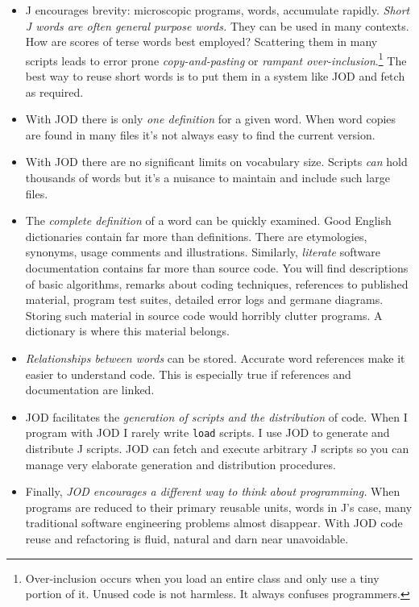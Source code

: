 \begin{itemize}
	\item J encourages brevity: microscopic programs, words, accumulate rapidly.  
	\emph{Short J words are often general purpose words. } They can be used in many contexts.  How  
	are scores of terse words best employed? Scattering them in many scripts leads
	to error prone \emph{copy-and-pasting} or 
	 \emph{rampant over-inclusion}.\footnote{Over-inclusion occurs when you load 
	an entire class and only use a tiny portion of it.  Unused code is not harmless. It always confuses programmers.}  
	 The best way to reuse short words is to put
	 them in a system like JOD and fetch as required.   
	\item With JOD there is only \emph{one definition} for a given word. When word copies are
	 found in many files it's not always easy to find the current version.
	\item With JOD there are no significant limits on vocabulary size.  Scripts \emph{can} hold thousands
	of words but it's a nuisance to maintain and include such large files.
	\item The \emph{complete definition} of a word can 
	be quickly examined.  Good English dictionaries contain far more than
	definitions.  There are etymologies, synonyms, usage comments and illustrations.  Similarly,
	\emph{literate} software documentation contains far more than source code.  You will find
	descriptions of basic algorithms, remarks about coding techniques, references to
	published material, program test suites, detailed error
	logs and germane diagrams. Storing such material in source code would 
	horribly clutter programs.  A dictionary is where this material belongs.
	\item \emph{Relationships between words} can be stored.  Accurate word references
	 make it easier to understand code.  This is especially true if references 
	  and documentation are linked. 
	\item JOD facilitates the \emph{generation of scripts and the distribution} of code. When I
	program with JOD I rarely write \texttt{load} scripts.  I use JOD to generate and distribute
  J scripts.  JOD can fetch and execute arbitrary J scripts so you can manage
  very elaborate generation and distribution procedures.
   \item Finally, \emph{JOD encourages a different way to think about programming.} When programs are
   reduced to their primary reusable units, words in J's case, many traditional software engineering problems
   almost disappear. With JOD code reuse and refactoring is fluid, natural and darn near unavoidable.
\end{itemize}

